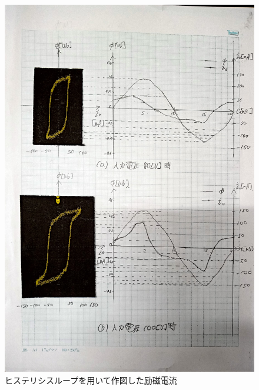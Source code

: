 \begin{figure}[h]
	\centering
	\includegraphics[scale=0.8]{./data/graph/3.pdf}
	\caption{ヒステリシスループを用いて作図した励磁電流}
	\label{fig:3}
\end{figure}